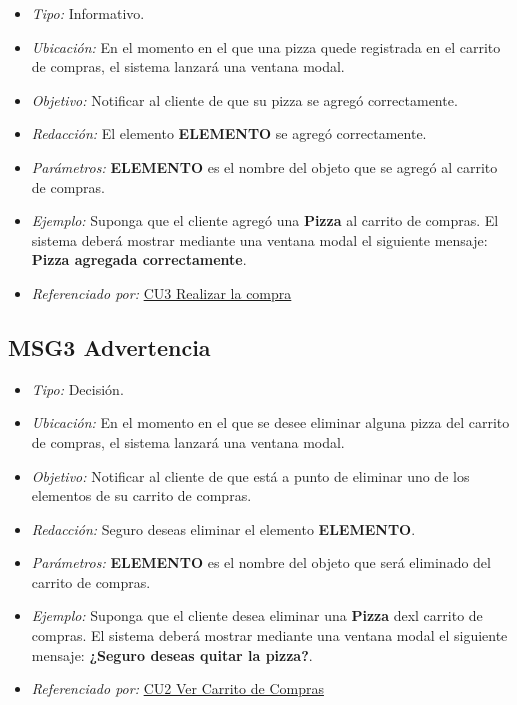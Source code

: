 \begin{itemize}
	
	\item \textit{Tipo:} Informativo.
	
	\item\textit{Ubicación:}  En el momento en el que una pizza quede registrada en el carrito de compras, el sistema lanzará una ventana modal.
	
	\item \textit{Objetivo:} Notificar al cliente de que su pizza se agregó correctamente.
	
	\item \textit{Redacción:} El elemento \textbf{ELEMENTO} se agregó correctamente.
	
	\item \textit{Parámetros:} \textbf{ELEMENTO} es el nombre del objeto que se agregó al carrito de compras.
	
	\item \textit{Ejemplo:} Suponga que el cliente agregó una \textbf{Pizza} al carrito de compras. El sistema deberá mostrar mediante una ventana modal el siguiente mensaje: \textbf{Pizza agregada correctamente}.
	
	\item \textit{Referenciado por:} \hyperlink{CU3}{CU3 Realizar la compra}
	
\end{itemize}

\hypertarget{MSG3:Advertencia}{}
\subsection{MSG3 Advertencia}

\begin{itemize}
	
	\item \textit{Tipo:} Decisión.
	
	\item\textit{Ubicación:}  En el momento en el que se desee eliminar alguna pizza del carrito de compras, el sistema lanzará una ventana modal.
	
	\item \textit{Objetivo:} Notificar al cliente de que está a punto de eliminar uno de los elementos de su carrito de compras.
	
	\item \textit{Redacción:} Seguro deseas eliminar el elemento \textbf{ELEMENTO}.
	
	\item \textit{Parámetros:} \textbf{ELEMENTO} es el nombre del objeto que será eliminado del carrito de compras.
	
	\item \textit{Ejemplo:} Suponga que el cliente desea eliminar una \textbf{Pizza} dexl carrito de compras. El sistema deberá mostrar mediante una ventana modal el siguiente mensaje: \textbf{¿Seguro deseas quitar la pizza?}.
	
	\item \textit{Referenciado por:} \hyperlink{CU2}{CU2 Ver Carrito de Compras}
	
\end{itemize}
